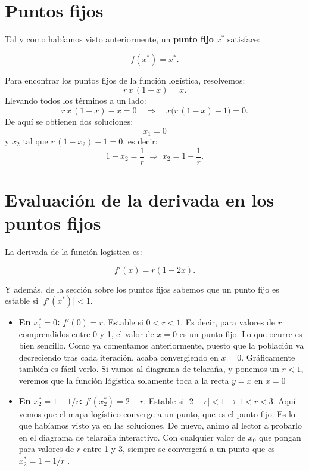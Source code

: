 \documentclass[
  10pt,
  a4paper,
  DIV=11,
  numbers=noendperiod,
  open=any]{scrreprt}
\providecommand{\tightlist}{%
  \setlength{\itemsep}{0pt}\setlength{\parskip}{0pt}}
\numberwithin{equation}{chapter}
\numberwithin{equation}{chapter}
\renewcommand{\[}{\begin{equation}}
\renewcommand{\]}{\end{equation}}
\begin{document}
\section{Puntos fijos}\label{puntos-fijos}

Tal y como habíamos visto anteriormente, un \textbf{punto fijo} \(x^*\)
satisface:

\begin{equation}

 f(x^*) = x^*.

\end{equation}

Para encontrar los puntos fijos de la función logística, resolvemos: \[
r\,x\,(1 - x) = x.
\] Llevando todos los términos a un lado: \[
r\,x\,(1 - x) - x = 0
\quad\Longrightarrow\quad
x\bigl(r\,(1 - x) - 1\bigr) = 0.
\] De aquí se obtienen dos soluciones: \[x_1 = 0\] y \(x_2\) tal que
\(r\,(1 - x_2) - 1 = 0\), es decir: \[
  1 - x_2 = \frac{1}{r}
  \;\Longrightarrow\;
  x_2 = 1 - \frac{1}{r}.
  \]

\section{Evaluación de la derivada en los puntos
fijos}\label{evaluaciuxf3n-de-la-derivada-en-los-puntos-fijos}

La derivada de la función logística es:

\begin{equation}

 f'(x) = r(1 - 2x).

\end{equation}

Y además, de la sección sobre los puntos fijos sabemos que un punto fijo
es estable si \(\lvert f'(x^*)\rvert < 1\).

\begin{itemize}
\tightlist
\item
  \textbf{En \(x^*_1=0\):} \(f'(0)=r\). Estable si \(0 < r < 1\). Es
  decir, para valores de \(r\) comprendidos entre 0 y 1, el valor de
  \(x=0\) es un punto fijo. Lo que ocurre es bien sencillo. Como ya
  comentamos anteriormente, puesto que la población va decreciendo tras
  cada iteración, acaba convergiendo en \(x=0\). Gráficamente también es
  fácil verlo. Si vamos al diagrama de telaraña, y ponemos un \(r<1\),
  veremos que la función lógistica solamente toca a la recta \(y=x\) en
  \(x=0\)
\item
  \textbf{En \(x^*_2=1-1/r\):} \(f'(x^*_2)=2-r\). Estable si
  \(\lvert2-r\rvert<1\) → \(1 < r < 3\). Aquí vemos que el mapa
  logístico converge a un punto, que es el punto fijo. Es lo que
  habíamos visto ya en las soluciones. De nuevo, animo al lector a
  probarlo en el diagrama de telaraña interactivo. Con cualquier valor
  de \(x_0\) que pongan para valores de \(r\) entre 1 y 3, siempre se
  convergerá a un punto que es \(x^*_2=1-1/r\) .
\end{itemize}
\end{document}
